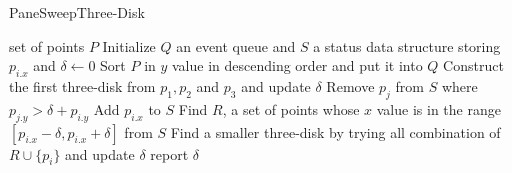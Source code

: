 \begin{algorithm}[h]
  \caption{PaneSweepThree-Disk}
  \label{alg:panesweep}
  \begin{algorithmic}
      \Require set of points $P$
      \State Initialize $Q$ an event queue and $S$ a status data structure storing $p_{i.x}$ and $\delta \leftarrow 0$
      \State Sort $P$ in $y$ value in descending order and put it into $Q$
      \State Construct the first three-disk from $p_1, p_2$ and $p_3$ and update $\delta$
	\State Remove $p_j$ from $S$ where  $ p_{j.y} > \delta + p_{i.y} $
	\State Add $p_{i.x}$ to $S$
	\State Find $R$, a set of points whose $x$ value is in the range  $[ p_{i.x} - \delta,  p_{i.x} + \delta ]$ from $S$
	\State Find a smaller three-disk by trying all combination of $R \cup \{p_i\}$ and update $\delta$
	\EndIf
      \EndFor
      \State report $\delta$
\end{algorithmic}
\end{algorithm}

